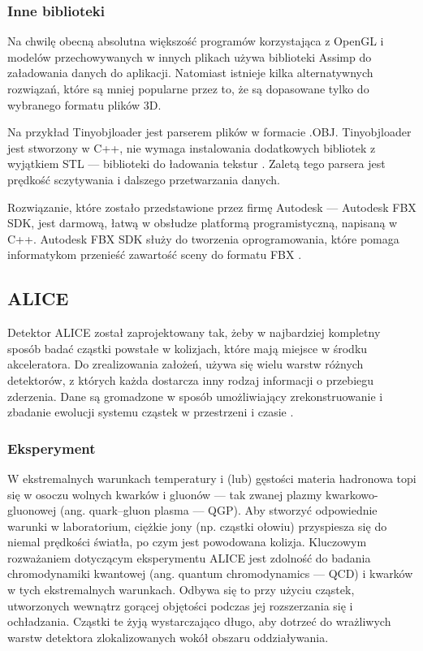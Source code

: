 \subsubsection{Inne biblioteki}
Na chwilę obecną absolutna większość programów korzystająca z OpenGL i modelów przechowywanych w innych plikach używa biblioteki Assimp do załadowania danych do aplikacji. Natomiast istnieje kilka alternatywnych rozwiązań, które są mniej popularne przez to, że są dopasowane tylko do wybranego formatu plików 3D.

Na przykład Tinyobjloader jest parserem plików w formacie .OBJ. Tinyobjloader jest stworzony w C++, nie wymaga instalowania dodatkowych bibliotek z wyjątkiem STL --- biblioteki do ładowania tekstur \cite{tinyobjloader}. Zaletą tego parsera jest prędkość sczytywania i dalszego przetwarzania danych. 

Rozwiązanie, które zostało przedstawione przez firmę Autodesk --- Autodesk FBX SDK, jest darmową, łatwą w obsłudze platformą programistyczną, napisaną w C++. Autodesk FBX SDK służy do tworzenia oprogramowania, które pomaga informatykom przenieść zawartość sceny do formatu FBX \cite{FBXSoftwareDevelopmentKit}.

\subsection{ALICE}
Detektor ALICE został zaprojektowany tak, żeby w najbardziej kompletny sposób badać cząstki powstałe w kolizjach, które mają miejsce w środku akceleratora. Do zrealizowania założeń, używa się wielu warstw różnych detektorów, z których każda dostarcza inny rodzaj informacji o przebiegu zderzenia. Dane są gromadzone w sposób umożliwiający zrekonstruowanie i zbadanie ewolucji systemu cząstek w przestrzeni i czasie \cite{aliceofficial}.

\subsubsection{Eksperyment}
W ekstremalnych warunkach temperatury i (lub) gęstości materia hadronowa topi się w osoczu wolnych kwarków i gluonów --- tak zwanej plazmy kwarkowo-gluonowej (ang. quark–gluon plasma --- QGP). Aby stworzyć odpowiednie warunki w laboratorium, ciężkie jony (np. cząstki ołowiu) przyspiesza się do niemal prędkości światła, po czym jest powodowana kolizja. Kluczowym rozważaniem dotyczącym eksperymentu ALICE jest zdolność do badania chromodynamiki kwantowej (ang.  quantum chromodynamics --- QCD) i kwarków w tych ekstremalnych warunkach. Odbywa się to przy użyciu cząstek, utworzonych wewnątrz gorącej objętości podczas jej rozszerzania się i ochładzania. Cząstki te żyją wystarczająco długo, aby dotrzeć do wrażliwych warstw detektora zlokalizowanych wokół obszaru oddziaływania.

